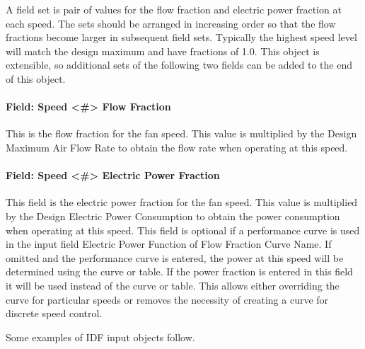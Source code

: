A field set is pair of values for the flow fraction and electric power fraction at each speed. The sets should be arranged in increasing order so that the flow fractions become larger in subsequent field sets.  Typically the highest speed level will match the design maximum and have fractions of 1.0.  This object is extensible, so additional sets of the following two fields can be added to the end of this object.

\paragraph{Field: Speed <\#> Flow Fraction}\label{field-speed-flow-fraction-fansysmodel}

This is the flow fraction for the fan speed. This value is multiplied by the Design Maximum Air Flow Rate to obtain the flow rate when operating at this speed.

\paragraph{Field: Speed <\#> Electric Power Fraction}\label{field-speed-power-fraction-fansysmodel}

This field is the electric power fraction for the fan speed. This value is multiplied by the Design Electric Power Consumption to obtain the power consumption when operating at this speed. This field is optional if a performance curve is used in the input field Electric Power Function of Flow Fraction Curve Name.  If omitted and the performance curve is entered, the power at this speed will be determined using the curve or table.  If the power fraction is entered in this field it will be used instead of the curve or table. This allows either overriding the curve for particular speeds or removes the necessity of creating a curve for discrete speed control.

Some examples of IDF input objects follow.


